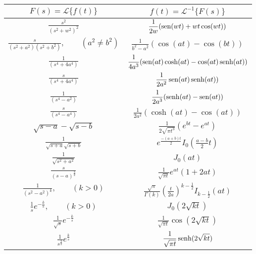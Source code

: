 \begin{table}%
\begin{small}
\begin{center}
{\renewcommand{\arraystretch}{1.9}%
\begin{tabular}{|c|c|}
\hline
 $\displaystyle F(s)=\mathcal{L }\{f(t)\} $&$\displaystyle  f(t)=\mathcal{L }^{-1}\{F(s)\}$ \\
\hline
 $\displaystyle \frac{s^2}{(s^2+w^2)^2} $&$\displaystyle  \frac{1}{2w}(\operatorname{sen}(wt)+wt\cos(wt))$ \\[1ex] 
\hline
 $\displaystyle \frac{s}{(s^2+a^2)(s^2+b^2)},\qquad (a^2\neq b^2) $&$\displaystyle  \frac{1}{b^2-a^2}(\cos(at)-\cos(bt))$ \\[1ex] 
\hline
 $\displaystyle \frac{1}{(s^4+4a^4)}$&$\displaystyle  \frac{1}{4a^3}(\operatorname{sen}(at)\cosh(at)-\cos(at)\operatorname{senh}(at))$ \\[1ex] 
\hline
$\displaystyle \frac{s}{(s^4+4a^4)} $&$\displaystyle  \frac{1}{2a^2}\operatorname{sen}(at)\operatorname{senh}(at))$ \\[2ex] 
\hline
 $\displaystyle \frac{1}{(s^4-a^2)} $&$\displaystyle  \frac{1}{2a^3}(\operatorname{senh}(at)-\operatorname{sen}(at))$ \\[1ex] 
\hline
 $\displaystyle \frac{s}{(s^4-a^4)} $&$\displaystyle  \frac{1}{2a^2}(\cosh(at)-\cos(at))$ \\[1ex] 
\hline
 $\displaystyle \sqrt{s-a}-\sqrt{s-b} $&$ \displaystyle  \frac{1}{2\sqrt{\pi t^3}}(e^{bt}-e^{at})$ \\[1ex] 
\hline
 $\displaystyle \frac{1}{\sqrt{s+a}\sqrt{s+b}} $&$\displaystyle  e^{\frac{-(a+b)t}{2}}I_0\left(\frac{a-b}{2}t\right)$ \\[1ex] 
\hline
 $\displaystyle \frac{1}{\sqrt{s^2+a^2}} $&$\displaystyle  J_0(at)$ \\[1ex] 
\hline
 $\displaystyle \frac{s}{(s-a)^{\frac{3}{2}}} $&$\displaystyle  \frac{1}{\sqrt{\pi t}}e^{at}(1+2at)$ \\[1ex] 
\hline
 $\displaystyle \frac{1}{(s^2-a^2)^k},\qquad (k>0) $&$\displaystyle  \frac{\sqrt{\pi}}{\Gamma(k)}\left(\frac{t}{2a}\right)^{k-\frac{1}{2}}I_{k-\frac{1}{2}}(at)$ \\[1ex] 
\hline
 $\displaystyle \frac{1}{s}e^{-\frac{k}{s}},\qquad (k>0)$&$\displaystyle  J_0(2\sqrt{kt})$ \\[1ex] 
\hline
 $\displaystyle \frac{1}{\sqrt{s}}e^{-\frac{k}{s}} $&$\displaystyle  \frac{1}{\sqrt{\pi t}}\cos(2\sqrt{k t})$ \\[1ex] 
\hline
 $\displaystyle \frac{1}{s^{\frac{3}{2}}}e^{\frac{k}{s}}$&$\displaystyle  \frac{1}{\sqrt{\pi t}}\operatorname{senh}(2\sqrt{k t})$ \\[1ex] 

\end{tabular}}
\end{center}
\end{small}
\end{table}
